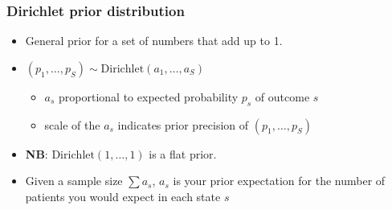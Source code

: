 
\begin{frame}

\frametitle{Dirichlet prior distribution}

\begin{itemize}
\item General prior for a set of numbers that add up to 1. 
\item[] $(p_1, \ldots, p_S) \sim \mbox{Dirichlet}(a_1, \ldots, a_S)$
\begin{itemize}
\item $a_s$ proportional to \alert{expected} probability $p_s$ of outcome $s$
\item scale of the $a_s$ indicates prior \alert{precision} of $(p_1, \ldots, p_S)$
\end{itemize}

\vspace{10pt}
\item \textbf{NB}: $\mbox{Dirichlet} (1,\ldots, 1)$ is a flat prior.
\item Given a sample size $\sum a_s$, $a_s$ is your prior expectation for the number
of patients you would expect in each state $s$
\end{itemize}

\end{frame}


